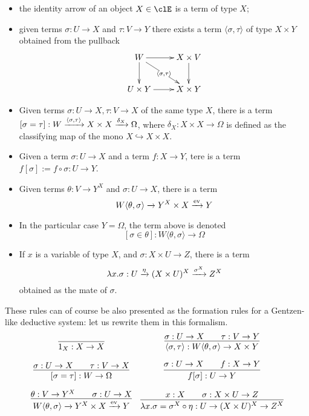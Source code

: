 \documentclass{amsart}
\def\la{\langle}
\def\ra{\rangle}
\def\lr#1#2{\la #1,#2\ra}
\begin{document}
\begin{itemize}
  \item the identity arrow of an object $X\in\clE$ is a term of type $X$;
  \item given terms $\sigma : U \to X$ and $\tau :  V\to Y$ there exists a term $\lr{\sigma}{\tau}$ of type $X\times Y$ obtained from the pullback
        \[\xymatrix{
          W \ar[d]\ar[r]\ar[dr]|{\lr{\sigma}{\tau}} & X \times V \ar[d]\\
          U\times Y \ar[r]& X\times Y
          }\]
  \item Given terms $\sigma : U \to X, \tau : V \to X$ of the same type $X$, there is a term $[\sigma = \tau] : W \xto{\lr{\sigma}{\tau}} X\times X \xto{\delta_X} \Omega$, where $\delta_X : X\times X \to \Omega$ is defined as the classifying map of the mono $X \hookrightarrow X\times X$.
  \item Given a term $\sigma : U \to X$ and a term $f : X \to Y$, tere is a term $f[\sigma] := f\circ\sigma : U \to Y$.
  \item Given terms $\theta :  V \to Y^X$ and $\sigma : U\to X$, there is a term
        \[
          W\lr{\theta}{\sigma} \xto{}Y^X\times X \xto{\text{ev}} Y
        \]
  \item In the particular case $Y=\Omega$, the term above is denoted
        \[[\sigma\in\theta] : W\lr{\theta}{\sigma} \to \Omega\]
  \item If $x$ is a variable of type $X$, and $\sigma : X\times U \to Z$, there is a term
        \[\lambda x.\sigma : U \xrightarrow{\eta} (X\times U)^X \xrightarrow{\sigma^X} Z^X\]
        obtained as the mate of $\sigma$.
\end{itemize}
These rules can of course be also presented as the formation rules for a Gentzen-like deductive system: let us rewrite them in this formalism.
\[ \begin{array}{cc}
    \infer{1_X : X \to X}{}                                                              &
    \infer{\lr{\sigma}{\tau} : W\lr{\theta}{\sigma} \to X \times Y }{\sigma : U \to X    &   & \tau : V \to Y}             \\[1em]
    \infer{[\sigma=\tau] : W \to \Omega}{\sigma : U \to X                                &   & \tau : V \to X}           &
    \infer{f[\sigma] : U \to Y}{\sigma : U \to X                                         &   & f : X \to Y}                \\[1em]
    \infer{W\lr{\theta}{\sigma} \xto{}Y^X\times X \xto{\text{ev}} Y}{\theta :  V \to Y^X &   & \sigma : U\to X}          &
    \infer{\lambda x.\sigma = \sigma^X\circ\eta : U \to (X\times U)^X \to Z^X}{ x: X     &   & \sigma : X\times U \to Z}
  \end{array}\]
\end{document}
